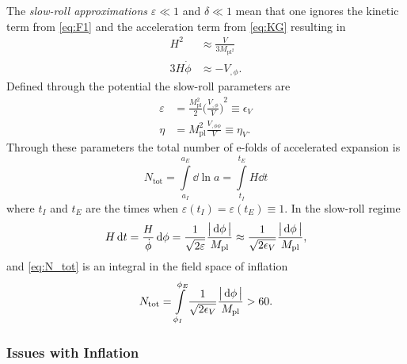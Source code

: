 The \emph{slow-roll approximations} \(\varepsilon \ll 1\) and \(\delta \ll 1\) mean that one ignores the kinetic term from \cref{eq:F1} and the acceleration term from \cref{eq:KG} resulting in
%
\begin{subequations}
	\begin{align}
		H^{2}        & \approx \frac{V}{3M_{\text{pl}^{2}}} \\
		3H\dot{\phi} & \approx -V_{,\phi}.
	\end{align}
\end{subequations}
%
Defined through the potential the slow-roll parameters are
%
\begin{subequations}
	\begin{align}
		\varepsilon & = \frac{M_{\text{pl}}^{2}}{2} {\bigg(\frac{V_{,\phi}}{V}\bigg)}^{2} \equiv \epsilon_{V} \\
		\eta        & = M_{\text{pl}}^{2} \frac{V_{,\phi\phi}}{V} \equiv \eta_{V}.
	\end{align}
\end{subequations}
%
Through these parameters the total number of e-folds of accelerated expansion is
%
\begin{equation}\label{eq:N_tot}
	N_{\text{tot}}
	= \int\limits_{a_{I}}^{a_{E}} \dd{\ln{a}}
	= \int\limits_{t_{I}}^{t_{E}} H \dd{t}
\end{equation}
%
where \(t_{I}\) and \(t_{E}\) are the times when \(\varepsilon(t_{I}) = \varepsilon(t_{E}) \equiv 1\).
In the slow-roll regime
%
\begin{equation}
	H \dd{t}
	= \frac{H}{\dot{\phi}} \dd{\phi}
	= \frac{1}{\sqrt{2\varepsilon}} \frac{\big\lvert\dd{\phi}\big\rvert}{M_{\text{pl}}}
	\approx \frac{1}{\sqrt{2\epsilon_{V}}} \frac{\big\lvert\dd{\phi}\big\rvert}{M_{\text{pl}}},
\end{equation}
%
and \cref{eq:N_tot} is an integral in the field space of inflation
%
\begin{equation}
	N_{\text{tot}}
	= \int\limits_{\phi_{I}}^{\phi_{E}}  \frac{1}{\sqrt{2\epsilon_{V}}} \frac{\big\lvert\dd{\phi}\big\rvert}{M_{\text{pl}}}
	> 60.
\end{equation}

\subsubsection{Issues with Inflation}

